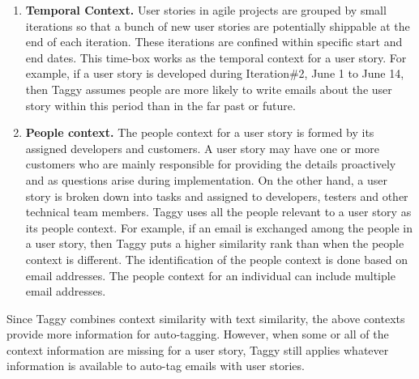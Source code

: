 \begin{enumerate}
	\item \textbf{Temporal Context.} User stories in agile projects are grouped by small iterations so that a bunch of new user stories are potentially shippable at the end of each iteration. These iterations are confined within specific start and end dates. This time-box works as the temporal context for a user story. For example, if a user story is developed during Iteration\#2, June 1 to June 14, then Taggy assumes people are more likely to write emails about the user story within this period than in the far past or future.
	
	\item \textbf{People context.} The people context for a user story is formed by its assigned developers and customers. A user story may have one or more customers who are mainly responsible for providing the details proactively and as questions arise during implementation. On the other hand, a user story is broken down into tasks and assigned to developers, testers and other technical team members. Taggy uses all the people relevant to a user story as its people context. For example, if an email is exchanged among the people in a user story, then Taggy puts a higher similarity rank than when the people context is different. The identification of the people context is done based on email addresses. The people context for an individual can include multiple email addresses.	
\end{enumerate}

Since Taggy combines context similarity with text similarity, the above contexts provide more information for auto-tagging. However, when some or all of the context information are missing for a user story, Taggy still applies whatever information is available to auto-tag emails with user stories.

